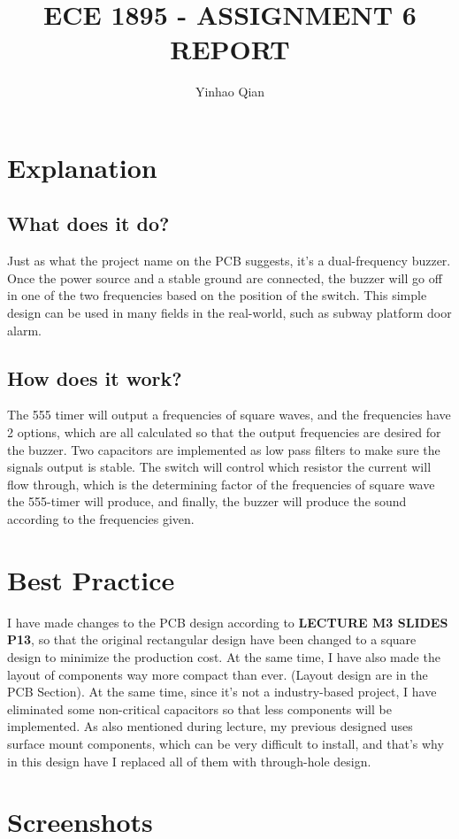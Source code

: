 \documentclass{article}
\title{ECE 1895 - ASSIGNMENT 6 REPORT}
\author{Yinhao Qian}
\begin{document}
	\maketitle
	\pagecolor{darkgray}
	\color{white}
	\section{Explanation}
	\subsection{What does it do?}
	Just as what the project name on the PCB suggests, it's a dual-frequency buzzer. Once the power source and a stable ground are connected, the buzzer will go off in one of the two frequencies based on the position of the switch. This simple design can be used in many fields in the real-world, such as subway platform door alarm. 
	\subsection{How does it work?}
	The 555 timer will output a frequencies of square waves, and the frequencies have 2 options, which are all calculated so that the output frequencies are desired for the buzzer. Two capacitors are implemented as low pass filters to make sure the signals output is stable. The switch will control which resistor the current will flow through, which is the determining factor of the frequencies of square wave the 555-timer will produce, and finally, the buzzer will produce the sound according to the frequencies given. 
	\section{Best Practice}
	I have made changes to the PCB design according to \textbf{LECTURE M3 SLIDES P13}, so that the original rectangular design have been changed to a square design to minimize the production cost. At the same time, I have also made the layout of components way more compact than ever. (Layout design are in the PCB Section). At the same time, since it's not a industry-based project, I have eliminated some non-critical capacitors so that less components will be implemented.\newline
	As also mentioned during lecture, my previous designed uses surface mount components, which can be very difficult to install, and that's why in this design have I replaced all of them with through-hole design.
	\section{Screenshots}
\end{document}
